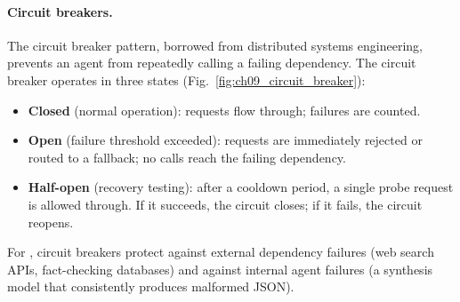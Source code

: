 \paragraph{Circuit breakers.}
The circuit breaker pattern, borrowed from distributed systems engineering, prevents an agent from repeatedly calling a failing dependency. The circuit breaker operates in three states (Fig.~\ref{fig:ch09_circuit_breaker}):
\begin{itemize}[leftmargin=1.5em, itemsep=2pt]
  \item \textbf{Closed} (normal operation): requests flow through; failures are counted.
  \item \textbf{Open} (failure threshold exceeded): requests are immediately rejected or routed to a fallback; no calls reach the failing dependency.
  \item \textbf{Half-open} (recovery testing): after a cooldown period, a single probe request is allowed through. If it succeeds, the circuit closes; if it fails, the circuit reopens.
\end{itemize}
For \ishtar{}, circuit breakers protect against external dependency failures (web search APIs, fact-checking databases) and against internal agent failures (a synthesis model that consistently produces malformed JSON).

